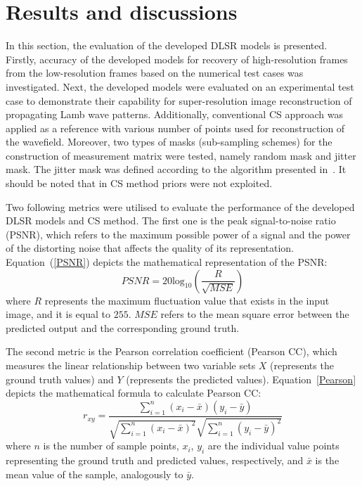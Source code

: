 \section{Results and discussions}
In this section, the evaluation of the developed DLSR models is presented.
Firstly, accuracy of the developed models for recovery of high-resolution frames from the low-resolution frames based on the numerical test cases was investigated.
Next, the developed models were evaluated on an experimental test case to demonstrate their capability for super-resolution image reconstruction of propagating Lamb wave patterns.
Additionally, conventional CS approach was applied as a reference with various number of points used for reconstruction of the wavefield.
Moreover, two types of masks (sub-sampling schemes) for the construction of measurement matrix were tested, namely random mask and jitter mask.
The jitter mask was defined according to the algorithm presented in~\cite{DiIanni2015}. 
It should be noted that in CS method priors were not exploited.

Two following metrics were utilised to evaluate the performance of the developed DLSR models and CS method.
The first one is the peak signal-to-noise ratio (PSNR), which refers to the maximum possible power of a signal and the power of the distorting noise that affects the quality of its representation.
Equation~(\ref{PSNR}) depicts the mathematical representation of the PSNR:
\begin{equation}
	PSNR=20\mathrm{log}_{10}\left(\frac{R}{\sqrt{MSE}}\right)
	\label{PSNR}
\end{equation}
where \(R\) represents the maximum fluctuation value that exists in the input image, and it is equal to \(255\).
\(MSE\) refers to the mean square error between the predicted output and the corresponding ground truth.

The second metric is the Pearson correlation coefficient (Pearson CC), which measures the linear relationship between two variable sets \textbf{\(X\)} (represents the ground truth values) and \textbf{\(Y\)} (represents the predicted values).
Equation~\ref{Pearson} depicts the mathematical formula to calculate Pearson CC:
\begin{equation}
	r_{xy} = \frac{\sum_{i=1}^{n}(x_i - \bar{x})(y_i-\bar{y})}{\sqrt{\sum_{i=1}^{n}(x_i - \bar{x})^2}\sqrt{\sum_{i=1}^{n}(y_i - \bar{y})^2}}
	\label{Pearson}
\end{equation}
where \(n\) is the number of sample points, \(x_i\), \(y_i\) are the individual value points representing the ground truth and predicted values, respectively, and \(\bar{x}\) is the mean value of the sample, analogously to \(\bar{y}\).


